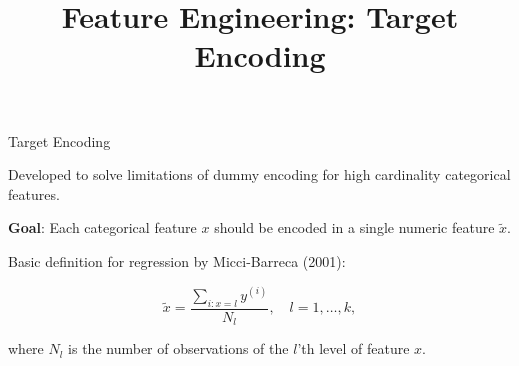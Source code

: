 



\newcommand{\titlefigure}{target_encoding_title.png}
\newcommand{\learninggoals}{
  \item Understand target encoding for high-cardinality categorical features
  \item Learn to address overfitting and leakage issues
  \item Know regularization techniques for target encoding
  \item Recognize when target encoding is preferred over one-hot
}

\title{Feature Engineering: Target Encoding}
\date{}




\sloppy



\begin{vbframe}{Target Encoding}

Developed to solve limitations of dummy encoding for high cardinality categorical features.

\textbf{Goal}: Each categorical feature $x$ should be encoded in a single numeric feature $\tilde x$.

Basic definition for regression by Micci-Barreca (2001):

$$\tilde x = \frac{\sum_{i:x=l}y^{(i)}}{N_l}, \quad l=1,\dots,k,$$

where $N_l$ is the number of observations of the $l$'th level of feature $x$.

\end{vbframe}


